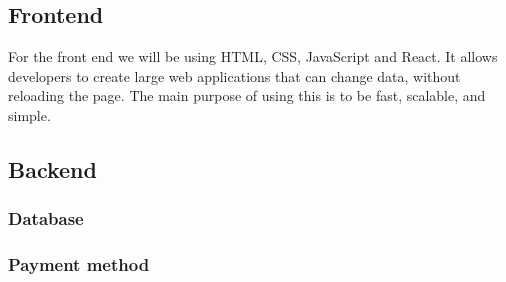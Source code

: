 \documentclass[12pt]{article}
\begin{document}
\subsection{Frontend}
For the front end we will be using HTML, CSS, JavaScript and React. It allows developers to create large web applications that can change data, without reloading the page. The main purpose of using this is to be fast, scalable, and simple.

\subsection{Backend}

\subsubsection{Database}

\subsubsection{Payment method}
\end{document}

